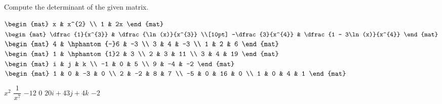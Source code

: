 
\begin{Exercise}[
name={},
title={}, 
difficulty=0,
origin={\cite{SZ}}]
Compute the determinant of the given matrix.
\begin{multicols}{2}
\Question $
\begin{mat}
 x & x^{2} \\ 1 & 2x 
\end{mat}$
\Question $
\begin{mat}
 \dfrac{1}{x^{3}} & \dfrac{\ln(x)}{x^{3}} \\[10pt] -\dfrac{3}{x^{4}} & \dfrac{1 - 3\ln(x)}{x^{4}} 
\end{mat}$
\Question $
\begin{mat}
 4 & \hphantom{-}6 & -3 \\ 3 & 4 & -3 \\ 1 & 2 & 6 
\end{mat}$
\Question $
\begin{mat}
1 & \hphantom{1}2 & 3 \\ 2 & 3 & 11 \\ 3 & 4 & 19 
\end{mat}$
\Question $
\begin{mat}
 i & j & k \\ -1 & 0 & 5 \\ 9 & -4 & -2 
\end{mat}$
\Question $
\begin{mat}
 1 & 0 & -3 & 0 \\ 2 & -2 & 8 & 7 \\ -5 & 0 & 16 & 0 \\ 1 & 0 & 4 & 1 
\end{mat}$
\EndCurrentQuestion
\end{multicols}

\end{Exercise}
\begin{Answer}
\Question $x^{2}$
\Question $\dfrac{1}{x^{7}}$
\Question $-12$
\Question $0$
\Question $20i + 43j + 4k$
\Question $-2$
\end{Answer}
